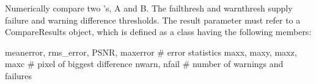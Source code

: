 \begin{comment}   %

\apiitem{bool ImageBufAlgo.{\ce computePixelStats} (PixelStats \&stats, src, \\
   \bigspc\bigspc  roi=ROI.All, nthreads=0)}
\index{ImageBufAlgo!computePixelStats} \indexapi{computePixelStats}

Compute statistics about the ROI of the image {\cf src}, storing results
in {\cf stats} (each of the vectors within {\cf stats} will be
automatically resized to the number of channels in the image).  A return
value of {\cf true} indicates success, {\cf false} indicates that it was
not possible to complete the operation.
 The {\cf PixelStats} structure is defined as follows:
\begin{code}
struct PixelStats {
    std::vector<float> min
    std::vector<float> max
    std::vector<float> avg
    std::vector<float> stddev
    std::vector<imagesize_t> nancount
    std::vector<imagesize_t> infcount
    std::vector<imagesize_t> finitecount
    std::vector<double> sum, sum2  # for intermediate calculation
}
\end{code}

\smallskip
\noindent Examples:
\begin{code}
    ImageBuf A ("a.exr")
    ImageBufAlgo.PixelStats stats
    ImageBufAlgo.computePixelStats (stats, A)
    for (int c = 0;  c < A.nchannels();  ++c) {
        print "Channel ", c, ":"
        print "   min = ", stats.min[c]
        print "   max = ", stats.max[c]
        print "   average = ", stats.avg[c]
        print "   standard deviation  = ", stats.stddev[c]
        print "   # NaN values    = ", stats.nancount[c]
        print "   # Inf values    = ", stats.infcount[c]
        print "   # finite values = ", stats.finitecount[c]
    }
\end{code}
\apiend
\end{comment}


 

Numerically compare two \ImageBuf's, {\cf A} and {\cf B}. The {\cf failthresh}
and {\cf warnthresh} supply failure and warning difference thresholds.
The {\cf result} parameter must refer to a {\cf CompareResults} object,
which is defined as a class having the following members:
\begin{code}
    meanerror, rms_error, PSNR, maxerror  # error statistics
    maxx, maxy, maxz, maxc                # pixel of biggest difference
    nwarn, nfail                          # number of warnings and failures
\end{code}

